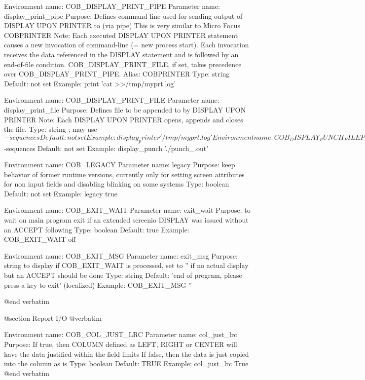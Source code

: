 Environment name:  COB_DISPLAY_PRINT_PIPE
  Parameter name:  display_print_pipe
         Purpose:  Defines command line used for sending output of
                   DISPLAY UPON PRINTER to (via pipe)
                   This is very similar to Micro Focus COBPRINTER
            Note:  Each executed DISPLAY UPON PRINTER statement causes a
                   new invocation of command-line (= new process start).
                   Each invocation receives the data referenced in
                   the DISPLAY statement and is followed by an
                   end-of-file condition.
                   COB_DISPLAY_PRINT_FILE, if set, takes precedence
                   over COB_DISPLAY_PRINT_PIPE.
           Alias:  COBPRINTER
            Type:  string
         Default:  not set
         Example:  print 'cat >>/tmp/myprt.log'

Environment name:  COB_DISPLAY_PRINT_FILE
  Parameter name:  display_print_file
         Purpose:  Defines file to be appended to by DISPLAY UPON PRINTER
            Note:  Each DISPLAY UPON PRINTER opens, appends and closes the file.
            Type:  string ; may use $-sequences
         Default:  not set
         Example:  display_printer '/tmp/myprt.log'

Environment name:  COB_DISPLAY_PUNCH_FILE
  Parameter name:  display_punch_file
         Purpose:  Defines file to be created on first
                   DISPLAY UPON SYSPUNCH/SYSPCH
            Note:  The file will be only be closed on runtime exit.
            Type:  string ; may use $-sequences
         Default:  not set
         Example:  display_punch './punch_$$.out'

Environment name:  COB_LEGACY
  Parameter name:  legacy
         Purpose:  keep behavior of former runtime versions, currently only
                   for setting screen attributes for non input fields and
                   disabling blinking on some systems
            Type:  boolean
         Default:  not set
         Example:  legacy true

Environment name:  COB_EXIT_WAIT
  Parameter name:  exit_wait
         Purpose:  to wait on main program exit if an extended screenio
                   DISPLAY was issued without an ACCEPT following
            Type:  boolean
         Default:  true
         Example:  COB_EXIT_WAIT off

Environment name:  COB_EXIT_MSG
  Parameter name:  exit_msg
         Purpose:  string to display if COB_EXIT_WAIT is processed, set to ''
                   if no actual display but an ACCEPT should be done
            Type:  string
         Default:  'end of program, please press a key to exit' (localized)
         Example:  COB_EXIT_MSG ''


@end verbatim

@section Report I/O
@verbatim


Environment name:  COB_COL_JUST_LRC
  Parameter name:  col_just_lrc
         Purpose:  If true, then COLUMN defined as LEFT, RIGHT or CENTER
                   will have the data justified within the field limits
                   If false, then the data is just copied into the column as is
            Type:  boolean
         Default:  TRUE
         Example:  col_just_lrc True
@end verbatim
